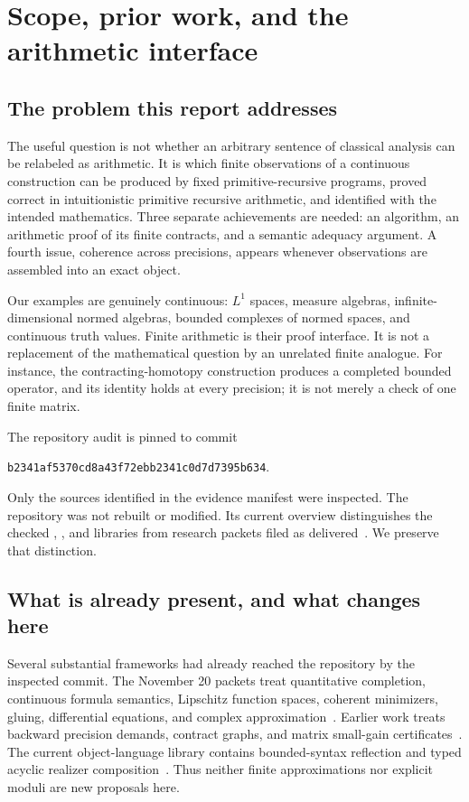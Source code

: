 \section{Scope, prior work, and the arithmetic interface}\label{sec:foundations}

\subsection{The problem this report addresses}

The useful question is not whether an arbitrary sentence of classical analysis can be relabeled as arithmetic. It is which finite observations of a continuous construction can be produced by fixed primitive-recursive programs, proved correct in intuitionistic primitive recursive arithmetic, and identified with the intended mathematics. Three separate achievements are needed: an algorithm, an arithmetic proof of its finite contracts, and a semantic adequacy argument. A fourth issue, coherence across precisions, appears whenever observations are assembled into an exact object.

Our examples are genuinely continuous: $L^1$ spaces, measure algebras, infinite-dimensional normed algebras, bounded complexes of normed spaces, and continuous truth values. Finite arithmetic is their proof interface. It is not a replacement of the mathematical question by an unrelated finite analogue. For instance, the contracting-homotopy construction produces a completed bounded operator, and its identity holds at every precision; it is not merely a check of one finite matrix.

The repository audit is pinned to commit
\begin{center}\small\texttt{b2341af5370cd8a43f72ebb2341c0d7d7395b634}.\end{center}
Only the sources identified in the evidence manifest were inspected. The repository was not rebuilt or modified. Its current overview distinguishes the checked , , and  libraries from research packets filed as delivered~\cite{repo}. We preserve that distinction.

\subsection{What is already present, and what changes here}

Several substantial frameworks had already reached the repository by the inspected commit. The November 20 packets treat quantitative completion, continuous formula semantics, Lipschitz function spaces, coherent minimizers, gluing, differential equations, and complex approximation~\cite{repo-recent}. Earlier work treats backward precision demands, contract graphs, and matrix small-gain certificates~\cite{repo-dag,repo-coupled}. The current object-language library contains bounded-syntax reflection and typed acyclic realizer composition~\cite{repo-interfaces}. Thus neither finite approximations nor explicit moduli are new proposals here.

